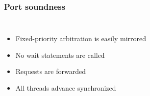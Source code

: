 \documentclass[]{beamer}
\begin{document}
         \begin{frame}
           \frametitle{Port soundness}
         \begin{columns}
             \begin{itemize}
               \item<1-> Fixed-priority arbitration is easily mirrored
               \item<2-> No wait statements are called
               \item<3-> Requests are forwarded 
               \item<4-> All threads advance synchronized
             \end{itemize} 

\end{columns}
\end{frame}
\end{document}
